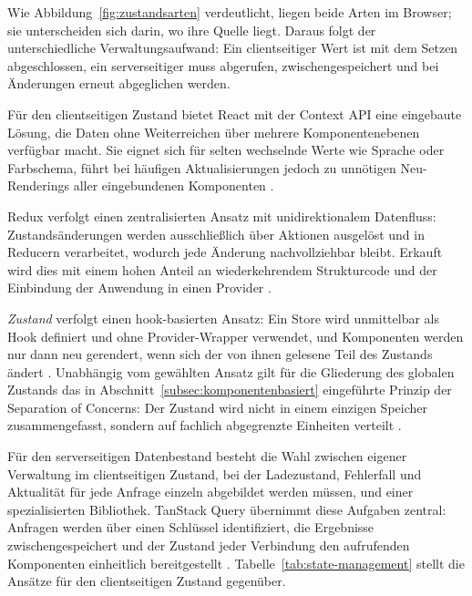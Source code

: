 Wie Abbildung~\ref{fig:zustandsarten} verdeutlicht, liegen beide
Arten im Browser; sie unterscheiden sich darin, wo ihre Quelle liegt.
Daraus folgt der unterschiedliche Verwaltungsaufwand: Ein
clientseitiger Wert ist mit dem Setzen abgeschlossen, ein
serverseitiger muss abgerufen, zwischengespeichert und bei Änderungen
erneut abgeglichen werden.

Für den clientseitigen Zustand bietet React mit der Context
\acs{API} eine eingebaute Lösung, die Daten ohne Weiterreichen über
mehrere Komponentenebenen verfügbar macht. Sie eignet sich für
selten wechselnde Werte wie Sprache oder Farbschema, führt bei
häufigen Aktualisierungen jedoch zu unnötigen Neu-Renderings aller
eingebundenen Komponenten \cite{react_docs, le_state_management}.

Redux verfolgt einen zentralisierten Ansatz mit unidirektionalem
Datenfluss: Zustandsänderungen werden ausschließlich über Aktionen
ausgelöst und in Reducern verarbeitet, wodurch jede Änderung
nachvollziehbar bleibt. Erkauft wird dies mit einem hohen Anteil an
wiederkehrendem Strukturcode und der Einbindung der Anwendung in
einen Provider \cite{redux_docs, le_state_management}.

\textit{Zustand} verfolgt einen hook-basierten Ansatz: Ein Store wird
unmittelbar als Hook definiert und ohne Provider-Wrapper verwendet,
und Komponenten werden nur dann neu gerendert, wenn sich der von
ihnen gelesene Teil des Zustands ändert \cite{zustand_docs}.
Unabhängig vom gewählten Ansatz gilt für die Gliederung des globalen
Zustands das in Abschnitt~\ref{subsec:komponentenbasiert}
eingeführte Prinzip der Separation of Concerns: Der Zustand wird
nicht in einem einzigen Speicher zusammengefasst, sondern auf
fachlich abgegrenzte Einheiten verteilt
\cite{zustand_docs}.

Für den serverseitigen Datenbestand besteht die Wahl zwischen
eigener Verwaltung im clientseitigen Zustand, bei der Ladezustand,
Fehlerfall und Aktualität für jede Anfrage einzeln abgebildet werden
müssen, und einer spezialisierten Bibliothek. TanStack Query
übernimmt diese Aufgaben zentral: Anfragen werden über einen
Schlüssel identifiziert, die Ergebnisse zwischengespeichert und der
Zustand jeder Verbindung den aufrufenden Komponenten einheitlich
bereitgestellt \cite{tanstack_query_docs}.
Tabelle~\ref{tab:state-management} stellt die Ansätze für den
clientseitigen Zustand gegenüber.

